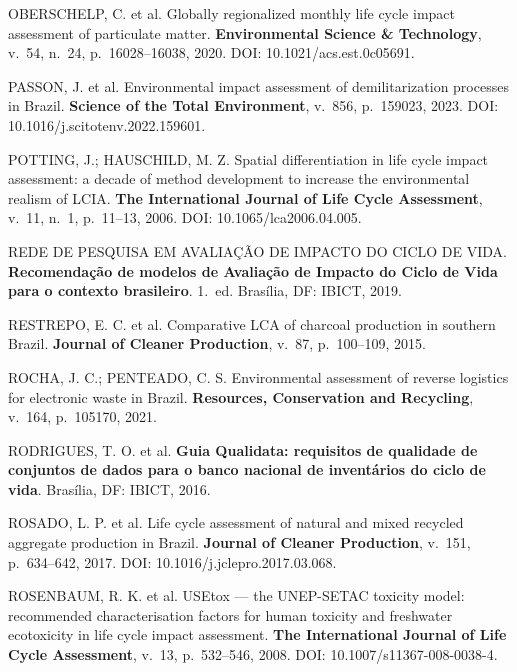 \begin{description}[style=nextline, leftmargin=0pt, labelindent=0pt]
\item[OBERSCHELP et al., 2020.] OBERSCHELP, C. et al. Globally regionalized monthly life cycle impact assessment of particulate matter. \textbf{Environmental Science \& Technology}, v.~54, n.~24, p.~16028--16038, 2020. DOI: 10.1021/acs.est.0c05691.

\item[PASSON et al., 2023.] PASSON, J. et al. Environmental impact assessment of demilitarization processes in Brazil. \textbf{Science of the Total Environment}, v.~856, p.~159023, 2023. DOI: 10.1016/j.scitotenv.2022.159601.

\item[POTTING; HAUSCHILD, 2006.] POTTING, J.; HAUSCHILD, M. Z. Spatial differentiation in life cycle impact assessment: a decade of method development to increase the environmental realism of LCIA. \textbf{The International Journal of Life Cycle Assessment}, v.~11, n.~1, p.~11--13, 2006. DOI: 10.1065/lca2006.04.005.

\item[RAICV, 2019.] REDE DE PESQUISA EM AVALIA\c{C}\~AO DE IMPACTO DO CICLO DE VIDA. \textbf{Recomenda\c{c}\~ao de modelos de Avalia\c{c}\~ao de Impacto do Ciclo de Vida para o contexto brasileiro}. 1.~ed. Bras\'ilia, DF: IBICT, 2019.

\item[RESTREPO et al., 2015.] RESTREPO, E. C. et al. Comparative LCA of charcoal production in southern Brazil. \textbf{Journal of Cleaner Production}, v.~87, p.~100--109, 2015.

\item[ROCHA; PENTEADO, 2021.] ROCHA, J. C.; PENTEADO, C. S. Environmental assessment of reverse logistics for electronic waste in Brazil. \textbf{Resources, Conservation and Recycling}, v.~164, p.~105170, 2021.

\item[RODRIGUES et al., 2016.] RODRIGUES, T. O. et al. \textbf{Guia Qualidata: requisitos de qualidade de conjuntos de dados para o banco nacional de invent\'arios do ciclo de vida}. Bras\'ilia, DF: IBICT, 2016.

\item[ROSADO et al., 2017.] ROSADO, L. P. et al. Life cycle assessment of natural and mixed recycled aggregate production in Brazil. \textbf{Journal of Cleaner Production}, v.~151, p.~634--642, 2017. DOI: 10.1016/j.jclepro.2017.03.068.

\item[ROSENBAUM et al., 2008.] ROSENBAUM, R. K. et al. USEtox --- the UNEP-SETAC toxicity model: recommended characterisation factors for human toxicity and freshwater ecotoxicity in life cycle impact assessment. \textbf{The International Journal of Life Cycle Assessment}, v.~13, p.~532--546, 2008. DOI: 10.1007/s11367-008-0038-4.


\end{description}
